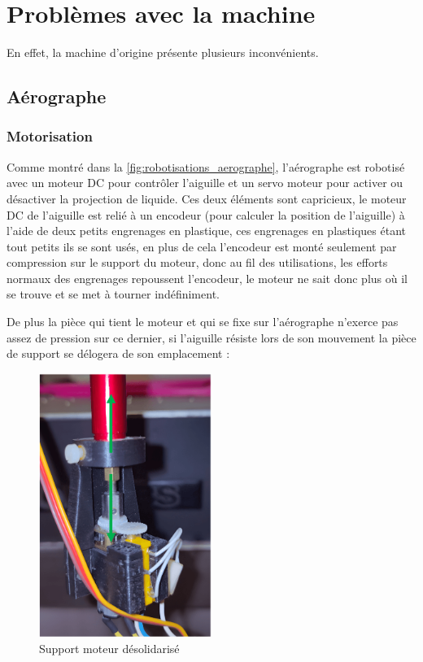 \newpage
\section{Problèmes avec la machine}
En effet, la machine d'origine présente plusieurs inconvénients.
\subsection{Aérographe}
\subsubsection{Motorisation}
Comme montré dans la \autoref{fig:robotisations_aerographe}, l'aérographe est robotisé avec un moteur DC pour contrôler l'aiguille et un servo moteur pour activer
ou désactiver la projection de liquide. Ces deux éléments sont capricieux, le moteur DC de l'aiguille est relié à un encodeur (pour calculer la position de l'aiguille) à l'aide de deux petits engrenages en
plastique, ces engrenages en plastiques étant tout petits ils se sont usés, en plus de cela l'encodeur est monté seulement par compression sur le support du moteur, donc au fil des utilisations, les efforts
normaux des engrenages repoussent l'encodeur, le moteur ne sait donc plus où il se trouve et se met à tourner indéfiniment.

De plus la pièce qui tient le moteur et qui se fixe sur l'aérographe n'exerce pas assez de pression sur ce dernier, si l'aiguille résiste lors de son mouvement
la pièce de support se délogera de son emplacement :

\begin{figure}[H]
  \centering
  \includegraphics[width = 0.5\textwidth]{assets/figures/situation_initiale/moteur_desolidarisation_aerographe.png}
  \caption{Support moteur désolidarisé}
\end{figure}


